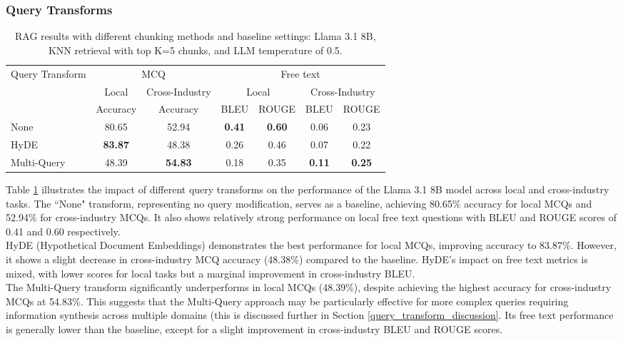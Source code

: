 \subsubsection{Query Transforms}

\begin{table}[H]
\centering
\begin{tabular}{lcccccc}
\hline
\multirow{3}{*}{Query Transform} & \multicolumn{2}{c}{MCQ} & \multicolumn{4}{c}{Free text} \\ \cline{2-7} 
 & Local & Cross-Industry & \multicolumn{2}{c}{Local} & \multicolumn{2}{c}{Cross-Industry} \\  
 & Accuracy & Accuracy & BLEU & ROUGE & BLEU & ROUGE \\ \hline
None        & 80.65 & 52.94 & \textbf{0.41} & \textbf{0.60} & 0.06 & 0.23 \\
HyDE        & \textbf{83.87} & 48.38 & 0.26 & 0.46 & 0.07 & 0.22 \\
Multi-Query & 48.39 & \textbf{54.83} & 0.18 & 0.35 & \textbf{0.11} & \textbf{0.25} \\ \hline
\end{tabular}
\caption{RAG results with different chunking methods and baseline settings: Llama 3.1 8B, KNN retrieval with top K=5 chunks, and LLM temperature of 0.5.}
\label{tab:query-transform-comparison}
\end{table}

Table \ref{tab:query-transform-comparison} illustrates the impact of different query transforms on the performance of the Llama 3.1 8B model across local and cross-industry tasks. The ``None" transform, representing no query modification, serves as a baseline, achieving 80.65\% accuracy for local MCQs and 52.94\% for cross-industry MCQs. It also shows relatively strong performance on local free text questions with BLEU and ROUGE scores of 0.41 and 0.60 respectively.\\

HyDE (Hypothetical Document Embeddings) demonstrates the best performance for local MCQs, improving accuracy to 83.87\%. However, it shows a slight decrease in cross-industry MCQ accuracy (48.38\%) compared to the baseline. HyDE's impact on free text metrics is mixed, with lower scores for local tasks but a marginal improvement in cross-industry BLEU.\\

The Multi-Query transform significantly underperforms in local MCQs (48.39\%), despite achieving the highest accuracy for cross-industry MCQs at 54.83\%. This suggests that the Multi-Query approach may be particularly effective for more complex queries requiring information synthesis across multiple domains (this is discussed further in Section \ref{query_transform_discussion}. Its free text performance is generally lower than the baseline, except for a slight improvement in cross-industry BLEU and ROUGE scores.


